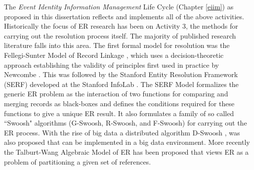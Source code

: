The \textit{Event Identity Information Management} Life Cycle (Chapter \ref{eiim}) as proposed in this dissertation reflects and implements all of the above activities. Historically the focus of ER research has been on Activity 3, the methods for carrying out the resolution process itself. The majority of published research literature falls into this area. The first formal model for resolution was the Fellegi-Sunter Model of Record Linkage \cite{fellegi1969theory}, which uses a decision-theoretic approach establishing the validity of principles first used in practice by Newcombe \cite{newcombe1959automatic}.  This was followed by the Stanford Entity Resolution Framework (SERF) developed at the Stanford InfoLab \cite{benjelloun2006generic}.  The SERF Model formalizes the generic ER problem as the interaction of two functions for comparing and merging records as black-boxes and defines the conditions required for these functions to give a unique ER result. It also formulates a family of so called ``Swoosh" algorithms (G-Swoosh, R-Swoosh, and F-Swoosh) for carrying out the ER process. With the rise of big data a distributed algorithm D-Swoosh \cite{benjelloun2007d}, was also proposed that can be implemented in a big data environment. More recently the Talburt-Wang Algebraic Model of ER has been proposed \cite{talburt2007algebraic} that views ER as a problem of partitioning a given set of references. 
 
